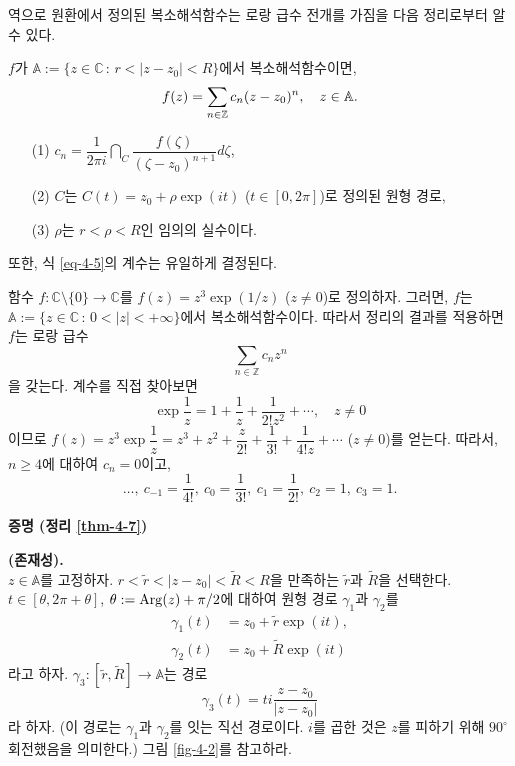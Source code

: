 역으로 원환에서 정의된 복소해석함수는 로랑 급수 전개를 가짐을 다음 정리로부터 알 수 있다.

\begin{salttheorem}{}{} \label{thm-4-7}
$f$가 $\mathbb A:= \{ z\in \mathbb C \,:\, r < |z-z_0| <R\}$에서 복소해석함수이면,
\begin{equation}\label{eq-4-5}
f(z) = \sum\limits_{n\in \mathbb Z} c_n(z-z_0)^n, \quad z\in\mathbb A.
\end{equation}
\begin{itemize}
\item[(1)] $c_n = \dfrac1{2\pi i} \dint_C \dfrac{f(\zeta)}{(\zeta - z_0)^{n+1}} d\zeta$,
\item[(2)] $C$는 $C(t) = z_0 + \rho \exp(it)$ ($t\in [0,2\pi]$)로 정의된 원형 경로,
\item[(3)] $\rho$는 $r<\rho<R$인 임의의 실수이다.
\end{itemize}
또한, 식 \eqref{eq-4-5}의 계수는 유일하게 결정된다.
\end{salttheorem}

\begin{saltexample}[label=example-4-11]{}{}
함수 $f:\mathbb C\setminus \{0\} \to \mathbb C$를
$f(z) = z^3\exp(1/z)$ ($z\ne0$)로 정의하자.
그러면, $f$는 $\mathbb A:= \{ z\in \mathbb C \,:\,  0 <|z| <+\infty \}$에서
복소해석함수이다. 따라서 정리의 결과를 적용하면
$f$는 로랑 급수
\[
\sum_{n\in\mathbb Z} c_n z^n
\]
을 갖는다. 
계수를 직접 찾아보면
\[
\exp \dfrac 1z = 1 + \dfrac1z + \dfrac1{2!z^2} + \cdots, \quad z\ne0
\]
이므로
$f(z) = z^3 \exp \dfrac 1z = z^3 + z^2 + \dfrac z{2!} + \dfrac1{3!}
+ \dfrac1{4!z} + \cdots$ ($z\ne 0$)를 얻는다.
따라서, $n\ge4$에 대하여 $c_n=0$이고,
\[
\ldots,\ c_{-1} = \dfrac1{4!}, \ c_0 = \dfrac1{3!},\ c_1 = \dfrac1{2!}, \ c_2 = 1, \ c_3 = 1.
\]
\end{saltexample}

{\bf 증명 (정리 \ref{thm-4-7})}

\textbf{ (존재성).} \\[1ex]
$z\in \mathbb A$를 고정하자.
$r < \tilde r < |z-z_0| <\tilde R <R$을 만족하는 $\tilde r$과  $\tilde R$을 선택한다.
$t\in [\theta, 2\pi + \theta]$, $\theta:= \mathop{\mathrm{Arg}}(z) + \pi/2$에 대하여
원형 경로 $\gamma_1$과  $\gamma_2$를 
\begin{align*}
\gamma_1(t) &= z_0 + \tilde r \exp (it),\\
\gamma_2(t) &= z_0 + \tilde R \exp (it)
\end{align*}
라고 하자. 
$\gamma_3: [\tilde r, \tilde R] \to \mathbb A$는 경로
\[
\gamma_3(t) = ti\dfrac{z-z_0}{|z-z_0|}
\]
라 하자. (이 경로는 $\gamma_1$과 $\gamma_2$를 잇는 직선 경로이다.
$i$를 곱한 것은 $z$를 피하기 위해 $90^\circ$ 회전했음을 의미한다.)
그림 \ref{fig-4-2}를 참고하라.

